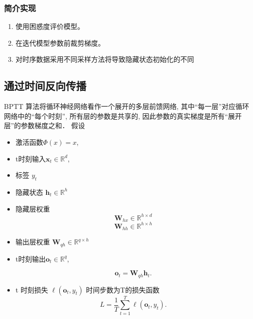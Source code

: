 \documentclass[a4paper]{article}
\begin{document}



\subsubsection{简介实现}

\begin{enumerate}
    \item  使用困惑度评价模型。
    \item  在迭代模型参数前裁剪梯度。
    \item  对时序数据采用不同采样方法将导致隐藏状态初始化的不同
\end{enumerate}

\subsection{通过时间反向传播}
BPTT 算法将循环神经网络看作一个展开的多层前馈网络, 其中“每一层”对应循环网络中的“每个时刻”, 所有层的参数是共享的, 因此参数的真实梯度是所有“展开层”的参数梯度之和．
假设
\begin{itemize}
\item 激活函数$\Phi(x)=x$, 
\item t时刻输入$\boldsymbol{x}_t \in \mathbb{R}^d$, 
\item 标签 $y_t$
\item 隐藏状态 $\boldsymbol{h}_t \in \mathbb{R}^h$
\item 隐藏层权重 
$$\boldsymbol{W}_{hx} \in \mathbb{R}^{h \times d}$$
$$\boldsymbol{W}_{hh} \in \mathbb{R}^{h \times h}$$
\item 输出层权重
$\boldsymbol{W}_{qh} \in \mathbb{R}^{q \times h}$
\item
t时刻输出$\boldsymbol{o}_t \in \mathbb{R}^q$, 

$$\boldsymbol{o}_t = \boldsymbol{W}_{qh} \boldsymbol{h}_{t}.$$
\item 
t 时刻损失 $\ell(\boldsymbol{o}_t,  y_t)$
时间步数为T的损失函数$$L = \frac{1}{T} \sum_{t=1}^T \ell (\boldsymbol{o}_t,  y_t).$$
\end{itemize}
  
\end{document}
